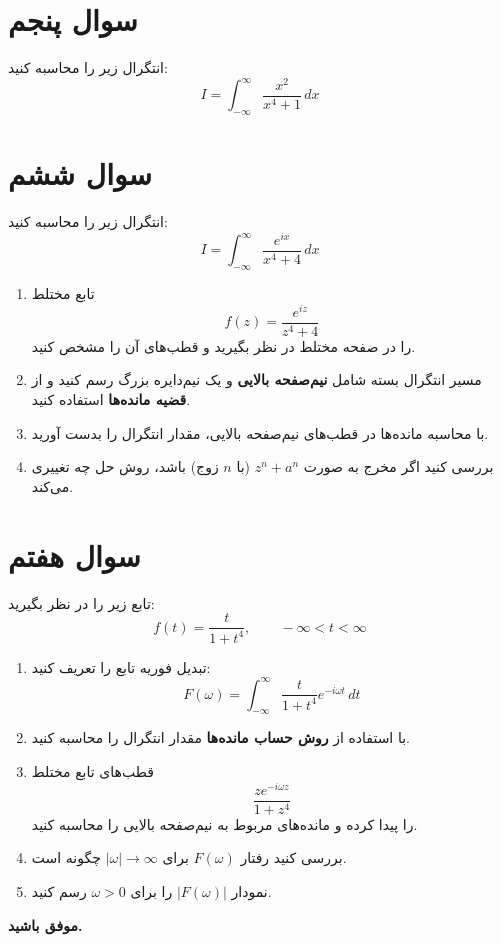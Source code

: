 \documentclass[a4paper,16pt]{article}
\begin{document}
	
	\section{سوال پنجم}
	
	انتگرال زیر را محاسبه کنید:
	\[
	I = \int_{-\infty}^{\infty} \frac{x^2}{x^4 + 1}\, dx
	\]
	
	
	\section{سوال ششم}
	
	انتگرال زیر را محاسبه کنید:
	\[
	I = \int_{-\infty}^{\infty} \frac{e^{ix}}{x^4 + 4}\, dx
	\]
	
	\begin{enumerate}
		\item تابع مختلط
		\[
		f(z) = \frac{e^{iz}}{z^4 + 4}
		\]
		را در صفحه مختلط در نظر بگیرید و قطب‌های آن را مشخص کنید.
		
		\item مسیر انتگرال بسته شامل \textbf{نیم‌صفحه بالایی} و یک نیم‌دایره بزرگ رسم کنید و از \textbf{قضیه مانده‌ها} استفاده کنید.
		
		\item با محاسبه مانده‌ها در قطب‌های نیم‌صفحه بالایی، مقدار انتگرال را بدست آورید.
		
		\item بررسی کنید اگر مخرج به صورت $z^n + a^n$ (با $n$ زوج) باشد، روش حل چه تغییری می‌کند.
	\end{enumerate}
	
	
	\section{سوال هفتم}
	
	تابع زیر را در نظر بگیرید:
	\[
	f(t) = \frac{t}{1+t^4}, \qquad -\infty < t < \infty
	\]
	
	\begin{enumerate}
		\item تبدیل فوریه تابع را تعریف کنید:
		\[
		F(\omega) = \int_{-\infty}^{\infty}
		\frac{t}{1+t^4} e^{-i\omega t}\, dt
		\]
		
		\item با استفاده از \textbf{روش حساب مانده‌ها} مقدار انتگرال را محاسبه کنید.
		
		\item قطب‌های تابع مختلط
		\[
		\frac{z e^{-i\omega z}}{1+z^4}
		\]
		را پیدا کرده و مانده‌های مربوط به نیم‌صفحه بالایی را محاسبه کنید.
		
		\item بررسی کنید رفتار $F(\omega)$ برای $|\omega| \to \infty$ چگونه است.
		
		\item نمودار $|F(\omega)|$ را برای $\omega > 0$ رسم کنید.
	\end{enumerate}
	
	\vspace{10pt}
	\textbf{موفق باشید.}
	
\end{document}
